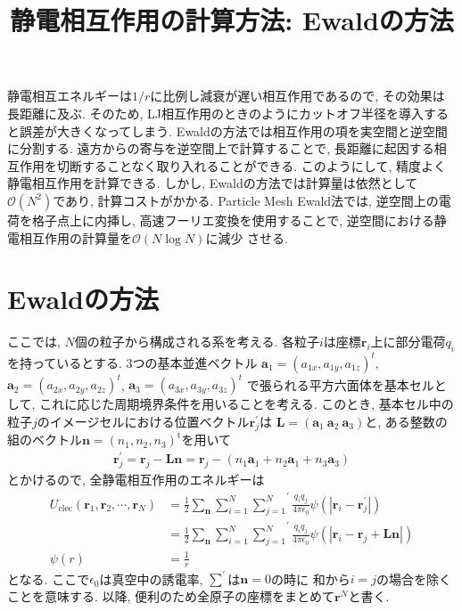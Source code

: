 





\title{静電相互作用の計算方法: Ewaldの方法}
\maketitle

静電相互エネルギーは$1/r$に比例し減衰が遅い相互作用であるので, その効果は長距離に及ぶ.
そのため, LJ相互作用のときのようにカットオフ半径を導入すると誤差が大きくなってしまう.
Ewaldの方法\cite{Okazaki2000, Ueda2003}では相互作用の項を実空間と逆空間に分割する.
遠方からの寄与を逆空間上で計算することで, 長距離に起因する相互作用を切断することなく取り入れることができる.
このようにして, 精度よく静電相互作用を計算できる.
しかし, Ewaldの方法では計算量は依然として$\mathcal{O}(N^{2})$であり, 計算コストがかかる.
Particle Mesh Ewald法\cite{Darden1993, Essmann1995}では, 逆空間上の電荷を格子点上に内挿し,
高速フーリエ変換を使用することで, 逆空間における静電相互作用の計算量を$\mathcal{O}(N \log N)$に減少
させる.

\section{Ewaldの方法}
ここでは, $N$個の粒子から構成される系を考える.
各粒子$i$は座標$\bm{r}_{i}$上に部分電荷$q_{i}$を持っているとする.
3つの基本並進ベクトル
$\bm{a}_{1} = (a_{1x}, a_{1y}, a_{1z})^{t}$,
$\bm{a}_{2} = (a_{2x}, a_{2y}, a_{2z})^{t}$,
$\bm{a}_{3} = (a_{3x}, a_{3y}, a_{3z})^{t}$
で張られる平方六面体を基本セルとして, これに応じた周期境界条件を用いることを考える.
このとき, 基本セル中の粒子$j$のイメージセルにおける位置ベクトル$\bm{r}_{j}^{\prime}$は
$\bm{L}=(\bm{a}_{1}~\bm{a}_{2}~\bm{a}_{3})$と,
ある整数の組のベクトル$\bm{n}=(n_{1},n_{2},n_{3})^{\mathrm{t}}$を用いて
\begin{align}
   \bm{r}_{j}^{\prime}
 = \bm{r}_{j} - \bm{Ln}
 = \bm{r}_{j}
  -(n_{1} \bm{a}_{1} +  n_{2}  \bm{a}_{1} + n_{3} \bm{a}_{3})
 \label{eq:Ewald1}
\end{align}
とかけるので, 全静電相互作用のエネルギーは
\begin{align}
    U_{\mathrm{elec}} (\bm{r}_{1}, \bm{r}_{2}, \cdots, \bm{r}_{N})
 &= \frac{1}{2} \sum_{\bm{n}} \sum_{i=1}^{N} \left.\sum_{j=1}^{N}\right.^{\prime}
    \frac{q_{i}q_{j}}{4 \pi \epsilon_{0}}
    \psi( |\bm{r}_{i} - \bm{r}_{j}^{\prime}| )
    \\
 &= \frac{1}{2} \sum_{\bm{n}} \sum_{i=1}^{N} \left.\sum_{j=1}^{N}\right.^{\prime}
    \frac{q_{i}q_{j}}{4 \pi \epsilon_{0}}
    \psi( |\bm{r}_{i} - \bm{r}_{j} + \bm{Ln}| )
 \label{eq:Ewald2.1}
 \\
 \psi(r) &= \frac{1}{r}
 \label{eq:Ewald2.2}
\end{align}
となる.
ここで$\epsilon_{0}$は真空中の誘電率, $\sum^{\prime}$は$\bm{n}=0$の時に
和から$i=j$の場合を除くことを意味する.
以降, 便利のため全原子の座標をまとめて$\bm{r}^{N}$と書く.

